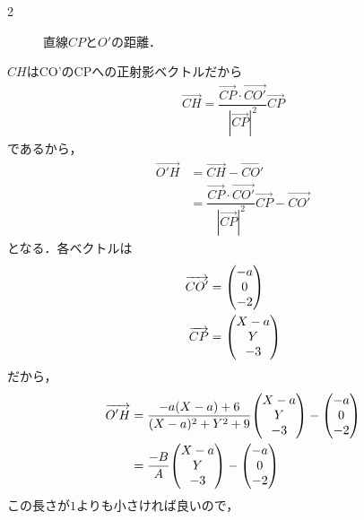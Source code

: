 \documentclass[../../main.tex]{subfiles}
\begin{document}
\begin{multicols}{2}
\begin{figure}[H]
    \caption{直線$CP$と$O'$の距離．}
  \end{figure}

  $CH$はCO'のCPへの正射影ベクトルだから
  \begin{align}
    \overrightarrow{CH} = \dfrac{\overrightarrow{CP}\cdot\overrightarrow{CO'}}{|\overrightarrow{CP}|^2}\overrightarrow{CP}
  \end{align}
  であるから，
  \begin{align}
    \overrightarrow{O'H}
    & = \overrightarrow{CH}-\overrightarrow{CO'} \\
    & = \dfrac{\overrightarrow{CP}\cdot\overrightarrow{CO'}}{|\overrightarrow{CP}|^2}\overrightarrow{CP} - \overrightarrow{CO'}
  \end{align}
  となる．各ベクトルは
  \begin{align}
    \overrightarrow{CO'} & = \mqty(-a  \\ 0 \\ -2)\\
    \overrightarrow{CP}  & = \mqty(X-a \\ Y \\ -3)
  \end{align}
  だから，
  \begin{align}
    \overrightarrow{O'H}
    & = \dfrac{-a(X-a)+6}{(X-a)^2+Y^2+9}\mqty(X-a \\ Y \\ -3) - \mqty(-a  \\ 0 \\ -2) \\
    & = \dfrac{-B}{A}\mqty(X-a                    \\ Y \\ -3) - \mqty(-a  \\ 0 \\ -2)
  \end{align}
  この長さが$1$よりも小さければ良いので，
  \begin{align}

\end{align}
\end{multicols}
\end{document}
